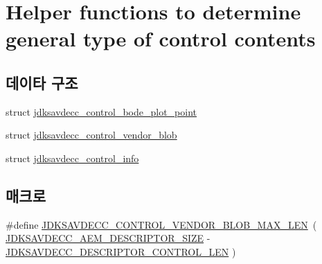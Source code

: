 \hypertarget{group__aem__control__value__helpers}{}\section{Helper functions to determine general type of control contents}
\label{group__aem__control__value__helpers}
\subsection*{데이타 구조}
\begin{DoxyCompactItemize}
\item 
struct \hyperlink{structjdksavdecc__control__bode__plot__point}{jdksavdecc\+\_\+control\+\_\+bode\+\_\+plot\+\_\+point}
\item 
struct \hyperlink{structjdksavdecc__control__vendor__blob}{jdksavdecc\+\_\+control\+\_\+vendor\+\_\+blob}
\item 
struct \hyperlink{structjdksavdecc__control__info}{jdksavdecc\+\_\+control\+\_\+info}
\end{DoxyCompactItemize}
\subsection*{매크로}
\begin{DoxyCompactItemize}
\item 
\#define \hyperlink{group__aem__control__value__helpers_ga57e56d1bcf3f14adaa62ca1b9204bbe2}{J\+D\+K\+S\+A\+V\+D\+E\+C\+C\+\_\+\+C\+O\+N\+T\+R\+O\+L\+\_\+\+V\+E\+N\+D\+O\+R\+\_\+\+B\+L\+O\+B\+\_\+\+M\+A\+X\+\_\+\+L\+EN}~( \hyperlink{group__descriptor_ga688689ad1de92c77262259e69b838ebf}{J\+D\+K\+S\+A\+V\+D\+E\+C\+C\+\_\+\+A\+E\+M\+\_\+\+D\+E\+S\+C\+R\+I\+P\+T\+O\+R\+\_\+\+S\+I\+ZE} -\/ \hyperlink{group__descriptor__control_gae9df372af3485fb181d19f0a820260b1}{J\+D\+K\+S\+A\+V\+D\+E\+C\+C\+\_\+\+D\+E\+S\+C\+R\+I\+P\+T\+O\+R\+\_\+\+C\+O\+N\+T\+R\+O\+L\+\_\+\+L\+EN} )
\end{DoxyCompactItemize}
